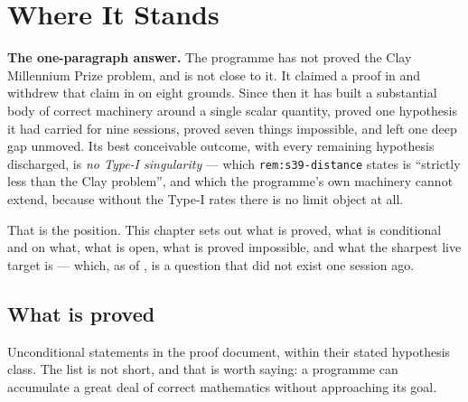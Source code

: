 \chapter{Where It Stands}
\label{ch:where-it-stands}

\begin{record}
\textbf{The one-paragraph answer.} The programme has not proved the Clay
Millennium Prize problem, and is not close to it. It claimed a proof in
 and withdrew that claim in  on eight grounds. Since then it has
built a substantial body of correct machinery around a single scalar quantity,
proved one hypothesis it had carried for nine sessions, proved seven things
impossible, and left one deep gap unmoved. Its best conceivable outcome, with
every remaining hypothesis discharged, is \emph{no Type-I singularity} ---
which \texttt{rem:s39-distance} states is ``strictly less than the Clay
problem'', and which the programme's own machinery cannot extend, because
without the Type-I rates there is no limit object at all.

\smallskip
That is the position. This chapter sets out what is proved, what is
conditional and on what, what is open, what is proved impossible, and what the
sharpest live target is --- which, as of , is a question that did not
exist one session ago.
\end{record}

\section{What is proved}
\label{sec:proved}

Unconditional statements in the proof document, within their stated hypothesis
class. The list is not short, and that is worth saying: a programme can
accumulate a great deal of correct mathematics without approaching its goal.

